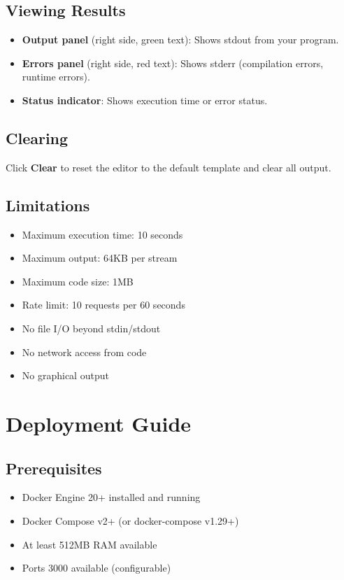 \documentclass[12pt,a4paper]{report}
\begin{document}
\section{Viewing Results}
\begin{itemize}
    \item \textbf{Output panel} (right side, green text): Shows stdout from your program.
    \item \textbf{Errors panel} (right side, red text): Shows stderr (compilation errors, runtime errors).
    \item \textbf{Status indicator}: Shows execution time or error status.
\end{itemize}

\section{Clearing}
Click \textbf{Clear} to reset the editor to the default template and clear all output.

\section{Limitations}
\begin{itemize}
    \item Maximum execution time: 10 seconds
    \item Maximum output: 64KB per stream
    \item Maximum code size: 1MB
    \item Rate limit: 10 requests per 60 seconds
    \item No file I/O beyond stdin/stdout
    \item No network access from code
    \item No graphical output
\end{itemize}

\chapter{Deployment Guide}

\section{Prerequisites}
\begin{itemize}
    \item Docker Engine 20+ installed and running
    \item Docker Compose v2+ (or docker-compose v1.29+)
    \item At least 512MB RAM available
    \item Ports 3000 available (configurable)
\end{itemize}
\end{document}
